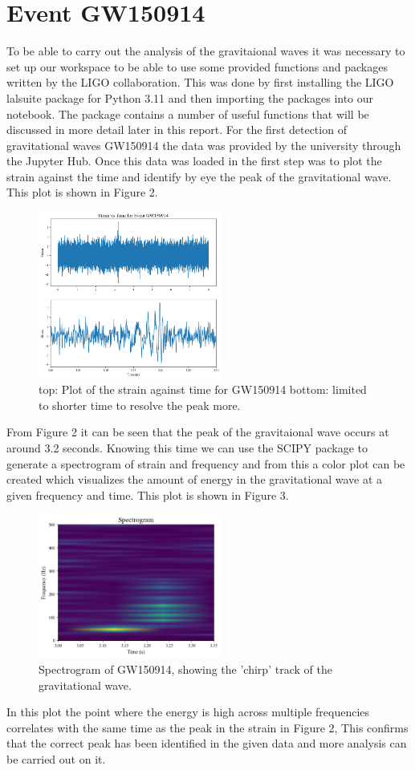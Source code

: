 \documentclass[]{article}
\begin{document}
\section*{Event GW150914}
To be able to carry out the analysis of the gravitaional waves it was necessary to set
up our workspace to be able to use some provided functions and packages written by the
LIGO collaboration. This was done by first installing the LIGO lalsuite package for Python 3.11
and then importing the packages into our notebook. The package contains a number of useful
functions that will be discussed in more detail later in this report.
For the first detection of gravitational waves GW150914 the data was provided
by the university through the Jupyter Hub. Once this data was loaded in
the first step was to plot the strain against the time and identify by eye the peak
of the gravitational wave. This plot is shown in Figure 2.
\begin{figure}
    \includegraphics[width=6cm]{images/Signal_gw150914.png}
    \caption{top: Plot of the strain against time for GW150914 bottom:
    limited to shorter time to resolve the peak more.}
    \label{fig:GW150914}
\end{figure}
\newpage
From Figure 2 it can be seen that the peak of the gravitaional wave occurs at
around 3.2 seconds.
Knowing this time we can use the SCIPY package to generate a spectrogram of strain and frequency and from this a color plot can be
created which visualizes the amount of energy in the gravitational wave at a given
frequency and time. This plot is shown in Figure 3.
\begin{figure}[h]
    \includegraphics[width=6cm]{images/spectrogram_gw150914.png}
    \caption{Spectrogram of GW150914, showing the 'chirp' track of the gravitational wave.}
    \label{fig:spectrogram}
\end{figure}
\newline
In this plot the point where the energy is high across multiple frequencies
correlates with the same time as the peak in the strain in Figure 2, This confirms that the correct peak has been identified
in the given data and more analysis can be carried out on it.
\end{document}
